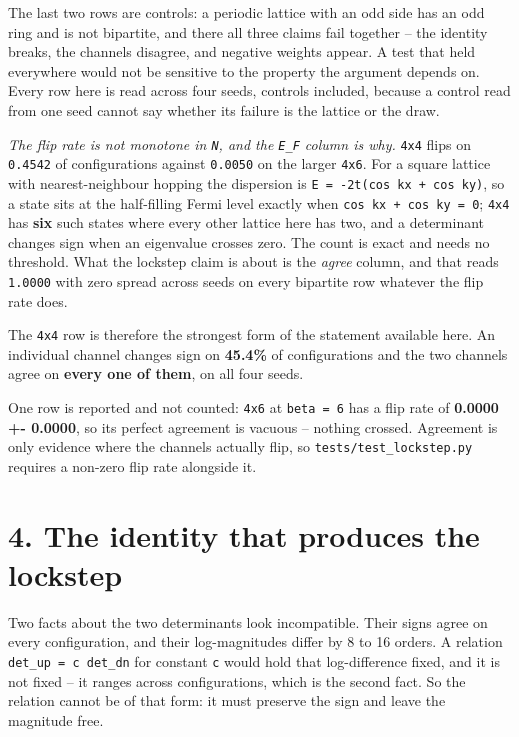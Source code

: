 \documentclass[10pt,letterpaper,twocolumn]{article}
\begin{document}
The last two rows are controls: a periodic lattice with an odd side has an odd ring and is not
bipartite, and there all three claims fail together -- the identity breaks, the channels
disagree, and negative weights appear. A test that held everywhere would not be sensitive to the
property the argument depends on. Every row here is read across four seeds, controls included,
because a control read from one seed cannot say whether its failure is the lattice or the draw.

\emph{The flip rate is not monotone in \texttt{N}, and the \texttt{E\_\allowbreak{}F} column is why.} \texttt{4x4} flips on \texttt{0.\allowbreak{}4542} of
configurations against \texttt{0.\allowbreak{}0050} on the larger \texttt{4x6}. For a square lattice with nearest-neighbour
hopping the dispersion is \texttt{E\ =\allowbreak{}\ -{}\allowbreak{}2t(\allowbreak{}cos\ kx\ +\allowbreak{}\ cos\ ky)\allowbreak{}}, so a state sits at the half-filling Fermi
level exactly when \texttt{cos\ kx\ +\allowbreak{}\ cos\ ky\ =\allowbreak{}\ 0}; \texttt{4x4} has \textbf{six} such states where every other lattice
here has two, and a determinant changes sign when an eigenvalue crosses zero. The count is exact
and needs no threshold. What the lockstep claim is about is the \emph{agree} column, and that reads
\texttt{1.\allowbreak{}0000} with zero spread across seeds on every bipartite row whatever the flip rate does.

The \texttt{4x4} row is therefore the strongest form of the statement available here. An individual
channel changes sign on \textbf{45.4\%} of configurations and the two channels agree on \textbf{every one of
them}, on all four seeds.

One row is reported and not counted: \texttt{4x6} at \texttt{beta\ =\allowbreak{}\ 6} has a flip rate of \textbf{0.0000 +- 0.0000},
so its perfect agreement is vacuous -- nothing crossed. Agreement is only evidence where the
channels actually flip, so \texttt{tests/\allowbreak{}test\_\allowbreak{}lockstep.\allowbreak{}py} requires a non-zero flip rate alongside it.

\section{4. The identity that produces the lockstep}\label{4-the-identity-that-produces-the-lockstep}

Two facts about the two determinants look incompatible. Their signs agree on every configuration,
and their log-magnitudes differ by 8 to 16 orders. A relation \texttt{det\_\allowbreak{}up\ =\allowbreak{}\ c\ det\_\allowbreak{}dn} for constant \texttt{c}
would hold that log-difference fixed, and it is not fixed -- it ranges across configurations, which
is the second fact. So the relation cannot be of that form: it must preserve the sign and leave the
magnitude free.
\end{document}
